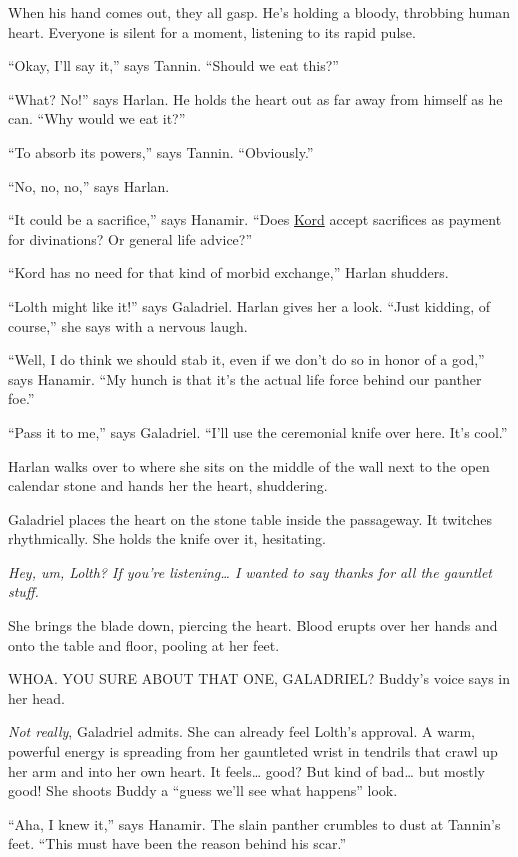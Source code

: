 \documentclass[smalldemyvopaper,11pt,twoside,onecolumn,openright,extrafontsizes]{memoir}
\begin{document}
When his hand comes out, they all gasp. He's holding a bloody, throbbing
human heart. Everyone is silent for a moment, listening to its rapid
pulse.

``Okay, I'll say it,'' says Tannin. ``Should we eat this?''

``What? No!'' says Harlan. He holds the heart out as far away from
himself as he can. ``Why would we eat it?''

``To absorb its powers,'' says Tannin. ``Obviously.''

``No, no, no,'' says Harlan.

``It could be a sacrifice,'' says Hanamir. ``Does
\href{/characters/kord/}{Kord} accept sacrifices as payment for
divinations? Or general life advice?''

``Kord has no need for that kind of morbid exchange,'' Harlan shudders.

``Lolth might like it!'' says Galadriel. Harlan gives her a look. ``Just
kidding, of course,'' she says with a nervous laugh.

``Well, I do think we should stab it, even if we don't do so in honor of
a god,'' says Hanamir. ``My hunch is that it's the actual life force
behind our panther foe.''

``Pass it to me,'' says Galadriel. ``I'll use the ceremonial knife over
here. It's cool.''

Harlan walks over to where she sits on the middle of the wall next to
the open calendar stone and hands her the heart, shuddering.

Galadriel places the heart on the stone table inside the passageway. It
twitches rhythmically. She holds the knife over it, hesitating.

\emph{Hey, um, Lolth? If you're listening\ldots{} I wanted to say thanks
for all the gauntlet stuff.}

She brings the blade down, piercing the heart. Blood erupts over her
hands and onto the table and floor, pooling at her feet.

WHOA. YOU SURE ABOUT THAT ONE, GALADRIEL? Buddy's voice says in her
head.

\emph{Not really}, Galadriel admits. She can already feel Lolth's
approval. A warm, powerful energy is spreading from her gauntleted wrist
in tendrils that crawl up her arm and into her own heart. It
feels\ldots{} good? But kind of bad\ldots{} but mostly good! She shoots
Buddy a ``guess we'll see what happens'' look.

``Aha, I knew it,'' says Hanamir. The slain panther crumbles to dust at
Tannin's feet. ``This must have been the reason behind his scar.''
\end{document}
